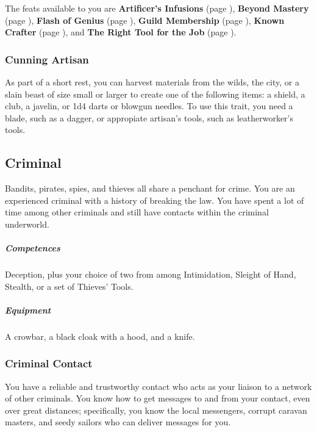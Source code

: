     The feats available to you are
    \textbf{Artificer's Infusions} (page \pageref{feat::artificersinfusion}),
    \textbf{Beyond Mastery} (page \pageref{feat::beyondmastery}),
    \textbf{Flash of Genius} (page \pageref{feat::flashofgenius}),
    \textbf{Guild Membership} (page \pageref{feat::guildmembership}),
    \textbf{Known Crafter} (page \pageref{feat::knowncrafter}), and
    \textbf{The Right Tool for the Job} (page \pageref{feat::therighttoolforthejob}).

    \subsubsection{Cunning Artisan} \label{feat::cunningartisan}
        As part of a short rest, you can harvest materials from the wilds, the city, or a slain beast of size small or larger to create one of the following items: a shield, a club, a javelin, or 1d4 darts or blowgun needles.
        To use this trait, you need a blade, such as a dagger, or appropiate artisan's tools, such as leatherworker's tools.

\subsection*{Criminal} \label{ssec::criminal}
    Bandits, pirates, spies, and thieves all share a penchant for crime.
    You are an experienced criminal with a history of breaking the law.
    You have spent a lot of time among other criminals and still have contacts within the criminal underworld.
    \subparagraph{Competences} Deception, plus your choice of two from among Intimidation, Sleight of Hand, Stealth, or a set of Thieves' Tools.
    \subparagraph{Equipment} A crowbar, a black cloak with a hood, and a knife.
    \subsubsection{Criminal Contact}
        You have a reliable and trustworthy contact who acts as your liaison to a network of other criminals.
        You know how to get messages to and from your contact, even over great distances; specifically, you know the local messengers, corrupt caravan masters, and seedy sailors who can deliver messages for you.

